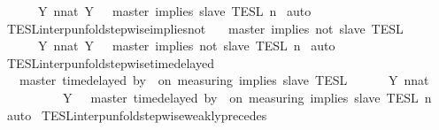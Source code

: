 \begin{isabellebody}
\ \ \ \ {\isacharequal}\ {\isasymInter}\ {\isacharbraceleft}Y{\isachardot}\ {\isasymexists}n{\isacharcolon}{\isacharcolon}nat{\isachardot}\ Y\ {\isacharequal}\ {\isasymlbrakk}\ master\ implies\ slave\ {\isasymrbrakk}\isactrlsub T\isactrlsub E\isactrlsub S\isactrlsub L\isactrlbsup {\isasymge}\ n\isactrlesup {\isacharbraceright}{\isacartoucheclose}\isanewline
%
\isadelimproof
%
\endisadelimproof
%
\isatagproof
{}\isamarkupfalse%
\ auto%
\endisatagproof
{\isafoldproof}%
%
\isadelimproof
\isanewline
%
\endisadelimproof
\isanewline
{}\isamarkupfalse%
\ TESL{\isacharunderscore}interp{\isacharunderscore}unfold{\isacharunderscore}stepwise{\isacharunderscore}implies{\isacharunderscore}not{\isacharcolon}\isanewline
\ \ {\isacartoucheopen}{\isasymlbrakk}\ master\ implies\ not\ slave\ {\isasymrbrakk}\isactrlsub T\isactrlsub E\isactrlsub S\isactrlsub L\isanewline
\ \ \ \ {\isacharequal}\ {\isasymInter}\ {\isacharbraceleft}Y{\isachardot}\ {\isasymexists}n{\isacharcolon}{\isacharcolon}nat{\isachardot}\ Y\ {\isacharequal}\ {\isasymlbrakk}\ master\ implies\ not\ slave\ {\isasymrbrakk}\isactrlsub T\isactrlsub E\isactrlsub S\isactrlsub L\isactrlbsup {\isasymge}\ n\isactrlesup {\isacharbraceright}{\isacartoucheclose}\isanewline
%
\isadelimproof
%
\endisadelimproof
%
\isatagproof
{}\isamarkupfalse%
\ auto%
\endisatagproof
{\isafoldproof}%
%
\isadelimproof
\isanewline
%
\endisadelimproof
\isanewline
{}\isamarkupfalse%
\ TESL{\isacharunderscore}interp{\isacharunderscore}unfold{\isacharunderscore}stepwise{\isacharunderscore}timedelayed{\isacharcolon}\isanewline
\ \ {\isacartoucheopen}{\isasymlbrakk}\ master\ time{\isacharminus}delayed\ by\ {\isasymdelta}{\isasymtau}\ on\ measuring\ implies\ slave\ {\isasymrbrakk}\isactrlsub T\isactrlsub E\isactrlsub S\isactrlsub L\isanewline
\ \ \ \ {\isacharequal}\ {\isasymInter}\ {\isacharbraceleft}Y{\isachardot}\ {\isasymexists}n{\isacharcolon}{\isacharcolon}nat{\isachardot}\isanewline
\ \ \ \ \ \ \ \ \ \ Y\ {\isacharequal}\ {\isasymlbrakk}\ master\ time{\isacharminus}delayed\ by\ {\isasymdelta}{\isasymtau}\ on\ measuring\ implies\ slave\ {\isasymrbrakk}\isactrlsub T\isactrlsub E\isactrlsub S\isactrlsub L\isactrlbsup {\isasymge}\ n\isactrlesup {\isacharbraceright}{\isacartoucheclose}\isanewline
%
\isadelimproof
%
\endisadelimproof
%
\isatagproof
{}\isamarkupfalse%
\ auto%
\endisatagproof
{\isafoldproof}%
%
\isadelimproof
\isanewline
%
\endisadelimproof
\isanewline
{}\isamarkupfalse%
\ TESL{\isacharunderscore}interp{\isacharunderscore}unfold{\isacharunderscore}stepwise{\isacharunderscore}weakly{\isacharunderscore}precedes{\isacharcolon}\isanewline

\end{isabellebody}

